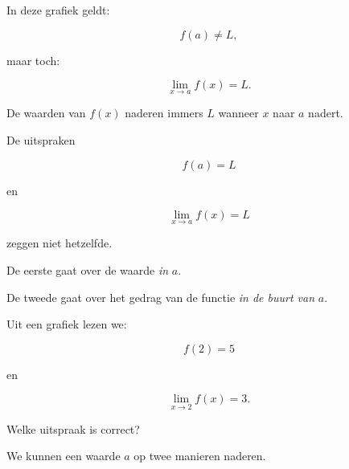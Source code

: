 \documentclass{ximera}
\begin{document}
In deze grafiek geldt:

\[
f(a)\neq L,
\]

maar toch:

\[
\boxed{
\lim_{x\to a}f(x)=L.
}
\]

De waarden van $f(x)$ naderen immers $L$ wanneer $x$ naar $a$
nadert.

\begin{eigenschap}

De uitspraken

\[
f(a)=L
\]

en

\[
\lim_{x\to a}f(x)=L
\]

zeggen niet hetzelfde.

De eerste gaat over de waarde \emph{in} $a$.

De tweede gaat over het gedrag van de functie \emph{in de buurt van}
$a$.

\end{eigenschap}



\begin{oefening}{\oefB\ESS}

Uit een grafiek lezen we:

\[
f(2)=5
\]

en

\[
\lim_{x\to2}f(x)=3.
\]

Welke uitspraak is correct?

\begin{multipleChoice}
\end{multipleChoice}

\end{oefening}




We kunnen een waarde $a$ op twee manieren naderen.
\end{document}
